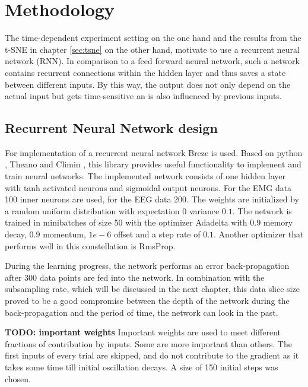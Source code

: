 \documentclass{article} %
\begin{document}
\section{Methodology}
The time-dependent experiment setting on the one hand and the results from the t-SNE in chapter \ref{sec:tsne} on the other hand, motivate to use a recurrent neural network (RNN). In comparison to a feed forward neural network, such a network contains recurrent connections within the hidden layer and thus saves a state between different inputs. By this way, the output does not only depend on the actual input but gets time-sensitive an is also influenced by previous inputs.

\subsection{Recurrent Neural Network design}
For implementation of a recurrent neural network Breze \cite{breze} is used. Based on python \cite{python}, Theano \cite{theano} and Climin \cite{climin}, this library provides useful functionality to implement and train neural networks. The implemented network consists of one hidden layer with tanh activated neurons and sigmoidal output neurons. For the EMG data 100 inner neurons are used, for the EEG data 200. The weights are initialized by a random uniform distribution with  expectation $0$ variance $0.1$. The network is trained in minibatches of size 50 with the optimizer Adadelta with $0.9$ memory decay, $0.9$ momentum, $1e-6$ offset and a step rate of $0.1$. Another optimizer that performs well in this constellation is RmsProp.

During the learning progress, the network performs an error back-propagation after $300$ data points are fed into the network. In combination with the subsampling rate, which will be discussed in the next chapter, this data slice size proved to be a good compromise between the depth of the network during the back-propagation and the period of time, the network can look in the past.


\textbf{TODO: important weights}
Important weights are used to meet different fractions of contribution by inputs. Some are more important than others. The first inputs of every trial are skipped, and do not contribute to the gradient as it takes some time till initial oscillation decays. A size of 150 initial steps was chosen.
\end{document}
